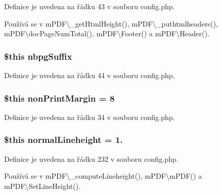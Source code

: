 Definice je uvedena na řádku 43 v souboru config.\-php.



Používá se v m\-P\-D\-F\textbackslash{}\-\_\-get\-Html\-Height(), m\-P\-D\-F\textbackslash{}\-\_\-puthtmlheaders(), m\-P\-D\-F\textbackslash{}doc\-Page\-Num\-Total(), m\-P\-D\-F\textbackslash{}\-Footer() a m\-P\-D\-F\textbackslash{}\-Header().

\hypertarget{config_8php_a15acdcf27eae956e16b855d034e85778}{
\subsubsection[{nbpg\-Suffix}]{\setlength{\rightskip}{0pt plus 5cm}\$this nbpg\-Suffix}}\label{config_8php_a15acdcf27eae956e16b855d034e85778}


Definice je uvedena na řádku 44 v souboru config.\-php.

\hypertarget{config_8php_a5bd2c4e34e5ffc2760a58482f8e6ecc9}{
\subsubsection[{non\-Print\-Margin}]{\setlength{\rightskip}{0pt plus 5cm}\$this non\-Print\-Margin = 8}}\label{config_8php_a5bd2c4e34e5ffc2760a58482f8e6ecc9}


Definice je uvedena na řádku 34 v souboru config.\-php.

\hypertarget{config_8php_af31b370a8cbad4623439f77426b157b3}{
\subsubsection[{normal\-Lineheight}]{\setlength{\rightskip}{0pt plus 5cm}\$this normal\-Lineheight = 1.}}\label{config_8php_af31b370a8cbad4623439f77426b157b3}


Definice je uvedena na řádku 232 v souboru config.\-php.



Používá se v m\-P\-D\-F\textbackslash{}\-\_\-compute\-Lineheight(), m\-P\-D\-F\textbackslash{}m\-P\-D\-F() a m\-P\-D\-F\textbackslash{}\-Set\-Line\-Height().

